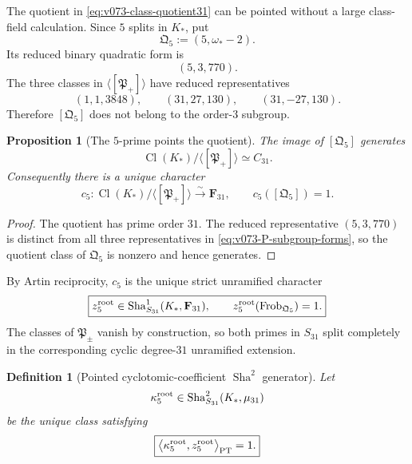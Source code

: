 \documentclass[11pt]{article}
\newtheorem{proposition}[theorem]{Proposition}
\newtheorem{definition}[theorem]{Definition}
\theoremstyle{remark}
\providecommand{\Sha}{\operatorname{Sha}}
\begin{document}
The quotient in \eqref{eq:v073-class-quotient31} can be pointed without a
large class-field calculation.  Since \(5\) splits in \(K_*\), put
\begin{equation}
 \boxed{
 \mathfrak Q_5:=(5,\omega_*-2).}
 \label{eq:v073-Q5}
\end{equation}
Its reduced binary quadratic form is
\[
 (5,3,770).
\]
The three classes in
\(\langle[\mathfrak P_+]\rangle\) have reduced representatives
\begin{equation}
 \boxed{
 (1,1,3848),\qquad
 (31,27,130),\qquad
 (31,-27,130).}
 \label{eq:v073-P-subgroup-forms}
\end{equation}
Therefore \([\mathfrak Q_5]\) does not belong to the order-\(3\) subgroup.

\begin{proposition}[The \(5\)-prime points the quotient]
\label{prop:v073-Q5-generator}
The image of \([\mathfrak Q_5]\) generates
\[
 \operatorname{Cl}(K_*)/
 \langle[\mathfrak P_+]\rangle
 \simeq C_{31}.
\]
Consequently there is a unique character
\begin{equation}
 \boxed{
 c_5:
 \operatorname{Cl}(K_*)/
 \langle[\mathfrak P_+]\rangle
 \xrightarrow{\sim}\mathbf F_{31},
 \qquad
 c_5([\mathfrak Q_5])=1.}
 \label{eq:v073-c5}
\end{equation}
\end{proposition}

\begin{proof}
The quotient has prime order \(31\).  The reduced representative
\((5,3,770)\) is distinct from all three representatives in
\eqref{eq:v073-P-subgroup-forms}, so the quotient class of
\(\mathfrak Q_5\) is nonzero and hence generates.
\end{proof}

By Artin reciprocity, \(c_5\) is the unique strict unramified character
\begin{equation}
 \boxed{
 z_5^{\rm root}
 \in
 \Sha^1_{S_{31}}(K_*,\mathbf F_{31}),
 \qquad
 z_5^{\rm root}(\operatorname{Frob}_{\mathfrak Q_5})=1.}
 \label{eq:v073-z5}
\end{equation}
The classes of \(\mathfrak P_\pm\) vanish by construction, so both primes in
\(S_{31}\) split completely in the corresponding cyclic degree-\(31\)
unramified extension.

\begin{definition}[Pointed cyclotomic-coefficient \(\Sha^2\) generator]
\label{def:v073-kappa-root}
Let
\[
 \kappa_5^{\rm root}
 \in
 \Sha^2_{S_{31}}(K_*,\mu_{31})
\]
be the unique class satisfying
\begin{equation}
 \boxed{
 \left\langle
 \kappa_5^{\rm root},z_5^{\rm root}
 \right\rangle_{\rm PT}=1.}
 \label{eq:v073-kappa-root}
\end{equation}
\end{definition}
\end{document}
